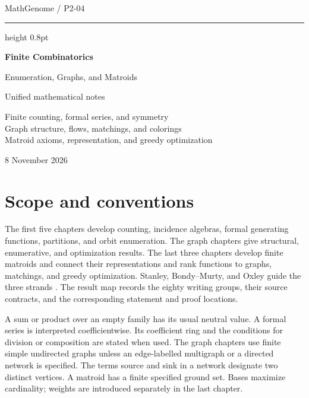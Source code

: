 \documentclass[11pt,oneside,openany]{book}
\theoremstyle{plain}
\theoremstyle{definition}
\theoremstyle{remark}
\begin{document}
\frontmatter
\hypersetup{pageanchor=false}
\begin{titlepage}
\thispagestyle{empty}
\vspace*{27mm}
{\large MathGenome \enspace / \enspace P2-04\par}
\vspace{8mm}
\hrule height 0.8pt
\vspace{11mm}
{\Huge\bfseries Finite Combinatorics\par}
\vspace{4mm}
{\LARGE Enumeration, Graphs, and Matroids\par}
\vspace{12mm}
{\large Unified mathematical notes\par}
\vspace{6mm}
{\normalsize Finite counting, formal series, and symmetry\\
Graph structure, flows, matchings, and colorings\\
Matroid axioms, representation, and greedy optimization\par}
\vfill
{\large 8 November 2026\par}
\end{titlepage}
\hypersetup{pageanchor=true}
\tableofcontents

\chapter*{Scope and conventions}
The first five chapters develop counting, incidence algebras, formal
generating functions, partitions, and orbit enumeration. The graph
chapters give structural, enumerative, and optimization results. The
last three chapters develop finite matroids and connect their
representations and rank functions to graphs, matchings, and greedy
optimization. Stanley, Bondy--Murty, and Oxley guide the three strands
\cite{Stanley,BM,Oxley}. The result map records the eighty writing groups,
their source contracts, and the corresponding statement and proof locations.

A sum or product over an empty family has its usual neutral value.
A formal series is interpreted coefficientwise. Its coefficient ring
and the conditions for division or composition are stated when used.
The graph chapters use finite simple undirected graphs unless an
edge-labelled multigraph or a directed network is specified. The
terms source and sink in a network designate two distinct vertices.
A matroid has a finite specified ground set. Bases maximize
cardinality; weights are introduced separately in the last chapter.
\end{document}
